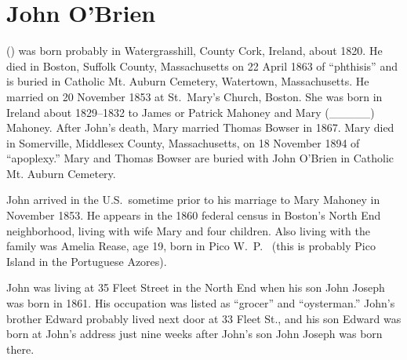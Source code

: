 \section{John O'Brien}

  () was born probably in Watergrasshill, County Cork, Ireland, about 1820.\cite{John2OBrienMarriage} He died in Boston, Suffolk County, Massachusetts on 22 April 1863 of ``phthisis'' \cite{John2OBrienDeath} and is buried in Catholic Mt. Auburn Cemetery, Watertown, Massachusetts.\cite{BillMcEvoy} He married  on 20 November 1853 at St.\ Mary's Church, Boston.\cite{John2OBrienMarriage} She was born in Ireland about 1829--1832 to James or Patrick Mahoney and Mary (\_\_\_\_\_)  Mahoney.\cite{John2OBrienCivilMarriage,MaryMahoneyBowserMarriage} After John's death, Mary married Thomas Bowser in 1867.\cite{MaryMahoneyBowserMarriage} Mary died in Somerville, Middlesex County, Massachusetts, on 18 November 1894 of ``apoplexy.''\cite{MaryMahoneyDeath} Mary and Thomas Bowser are buried with John O'Brien in Catholic Mt. Auburn Cemetery.\cite{BillMcEvoy}

John arrived in the U.S.\ sometime prior to his marriage to Mary Mahoney in November 1853. He appears in the 1860 federal census in Boston's North End neighborhood, living with wife Mary and four children. Also living with the family was Amelia Rease, age 19, born in Pico W.\ P.\ \cite{Census1860John} (this is probably Pico Island in the Portuguese Azores). 

John was living at 35 Fleet Street in the North End when his son John Joseph was born in 1861. His occupation was listed as ``grocer''\cite{John3OBrienBirth,Wards} and ``oysterman.''\cite{1861John2OBrien} John's brother Edward probably lived next door at 33 Fleet St.,\cite{1861EdwardOBrien} and his son Edward was born at John's address just nine weeks after John's son John Joseph was born there.\cite{John3OBrienBirth}

